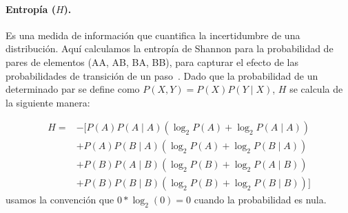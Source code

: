 
\paragraph{Entropía ($H$).} Es una medida de información que cuantifica la incertidumbre de una distribución. Aquí calculamos la entropía de Shannon para la probabilidad de pares de elementos (AA, AB, BA, BB), para capturar el efecto de las probabilidades de transición de un paso~\cite{f85}. Dado que la probabilidad de un determinado par se define como $P(X,Y) = P(X) P(Y \mid X)$, $H$ se calcula de la siguiente manera:

\begin{align*}
H =& - [ 
     P(A) P(A \mid A) (\log_2 P(A) + \log_2 P(A\mid A)) \\
   & +P(A) P(B \mid A) (\log_2 P(A) + \log_2 P(B\mid A)) \\
   & +P(B) P(A \mid B) (\log_2 P(B) + \log_2 P(A\mid B)) \\
   & +P(B) P(B \mid B) (\log_2 P(B) + \log_2 P(B\mid B)) 
     ] 
\end{align*}
usamos la convención que $0 * \log_2(0) = 0$ cuando la probabilidad es nula.



